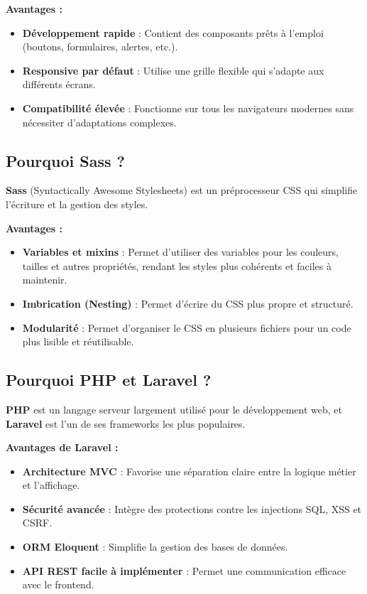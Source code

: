 \documentclass[a4paper,12pt]{article}
\begin{document}
\textbf{Avantages :}
\begin{itemize}
    \item \textbf{Développement rapide} : Contient des composants prêts à l’emploi (boutons, formulaires, alertes, etc.).
    \item \textbf{Responsive par défaut} : Utilise une grille flexible qui s’adapte aux différents écrans.
    \item \textbf{Compatibilité élevée} : Fonctionne sur tous les navigateurs modernes sans nécessiter d’adaptations complexes.
\end{itemize}

\subsection{Pourquoi Sass ?}
\textbf{Sass} (Syntactically Awesome Stylesheets) est un préprocesseur CSS qui simplifie l’écriture et la gestion des styles.

\textbf{Avantages :}
\begin{itemize}
    \item \textbf{Variables et mixins} : Permet d’utiliser des variables pour les couleurs, tailles et autres propriétés, rendant les styles plus cohérents et faciles à maintenir.
    \item \textbf{Imbrication (Nesting)} : Permet d’écrire du CSS plus propre et structuré.
    \item \textbf{Modularité} : Permet d’organiser le CSS en plusieurs fichiers pour un code plus lisible et réutilisable.
\end{itemize}

\subsection{Pourquoi PHP et Laravel ?}
\textbf{PHP} est un langage serveur largement utilisé pour le développement web, et \textbf{Laravel} est l’un de ses frameworks les plus populaires.

\textbf{Avantages de Laravel :}
\begin{itemize}
    \item \textbf{Architecture MVC} : Favorise une séparation claire entre la logique métier et l’affichage.
    \item \textbf{Sécurité avancée} : Intègre des protections contre les injections SQL, XSS et CSRF.
    \item \textbf{ORM Eloquent} : Simplifie la gestion des bases de données.
    \item \textbf{API REST facile à implémenter} : Permet une communication efficace avec le frontend.
\end{itemize}
\end{document}
